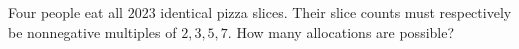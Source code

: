 Four people eat all $2023$ identical pizza slices. Their slice counts must respectively be nonnegative multiples of $2,3,5,7$. How many allocations are possible?
